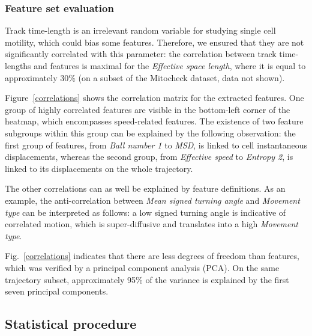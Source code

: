 \subsubsection{Feature set evaluation}
Track time-length is an irrelevant random variable for studying single cell motility, which could bias some features. Therefore, we ensured that they are not significantly correlated with this parameter: the correlation between track time-lengths and features is maximal for the \textit{Effective space length}, where it is equal to approximately $30\%$ (on a subset of the Mitocheck dataset, data not shown).

Figure~\ref{correlations} shows the correlation matrix for the
extracted features. 
One group of highly correlated features are visible in the bottom-left
corner of the heatmap, which encompasses speed-related features. The
existence of two feature subgroups within this group can be explained
by the following observation: the first group of features, from
\textit{Ball number 1} to \textit{MSD}, is linked to cell
instantaneous displacements, whereas the second group, from
\textit{Effective speed} to \textit{Entropy 2}, is linked to its
displacements on the whole trajectory.  

The other correlations can as well be explained by feature definitions. As an example, the anti-correlation between \textit{Mean signed turning angle} and \textit{Movement type} can be interpreted as follows: a low signed turning angle is indicative of correlated motion, which is super-diffusive and translates into a high \textit{Movement type}.

Fig.~\ref{correlations} indicates that there are less degrees of
freedom than features, which was verified by a principal component
analysis (PCA). On the same trajectory subset, approximately 95\% of
the variance is explained by the first seven principal components. 

\subsection{Statistical procedure}
\label{sec:stats}
